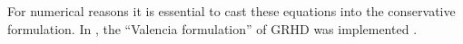 For numerical reasons it is essential to cast these equations into 
the conservative formulation. 
%
In \wisky{}, the ``Valencia formulation'' of \ac{GRHD} 
\citep{Banyuls:1997} was implemented \citep{Radice:2013apa}. 
